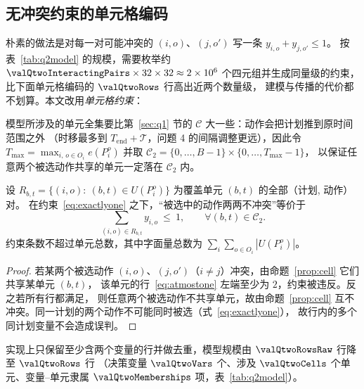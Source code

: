 \subsection{无冲突约束的单元格编码}

朴素的做法是对每一对可能冲突的 $(i,o)$、$(j,o')$ 写一条 $y_{i,o}+y_{j,o'}\le 1$。
按表~\ref{tab:q2model} 的规模，需要枚举约 $\valQtwoInteractingPairs\times 32\times 32\approx 2\times 10^{6}$
个四元组并生成同量级的约束，比下面单元格编码的 $\valQtwoRows$ 行高出近两个数量级，
建模与传播的代价都不划算。本文改用\emph{单元格约束}：

模型所涉及的单元全集要比第~\ref{sec:q1} 节的 $\mathcal{C}$ 大一些：动作会把计划推到原时间范围之外
（时移最多到 $T_{\mathrm{end}}+\mathcal{T}$，问题 4 的间隔调整更远），因此令
$T_{\max}=\max_{i,\,o\in O_i}e(P_i^{o})$ 并取 $\mathcal{C}_2=\{0,\dots,B-1\}\times\{0,\dots,T_{\max}-1\}$，
以保证任意两个被选动作共享的单元一定落在 $\mathcal{C}_2$ 内。

\begin{proposition}[单元格编码的精确性]\label{prop:exact}
设 $R_{b,t}=\{(i,o):\ (b,t)\in U(P_i^{o})\}$ 为覆盖单元 $(b,t)$ 的全部（计划, 动作）对。
在约束~\eqref{eq:exactlyone} 之下，“被选中的动作两两不冲突”等价于
\begin{equation}\label{eq:atmostone}
  \sum_{(i,o)\in R_{b,t}} y_{i,o}\ \le\ 1,\qquad \forall (b,t)\in\mathcal{C}_2.
\end{equation}
约束条数不超过单元总数，其中字面量总数为 $\sum_i\sum_{o\in O_i}|U(P_i^{o})|$。
\end{proposition}

\begin{proof}
若某两个被选动作 $(i,o)$、$(j,o')$（$i\neq j$）冲突，由命题~\ref{prop:cell} 它们共享某单元 $(b,t)$，
该单元的行~\eqref{eq:atmostone} 左端至少为 $2$，约束被违反。反之若所有行都满足，
则任意两个被选动作不共享单元，故由命题~\ref{prop:cell} 互不冲突。同一计划的两个动作不可能同时被选（式~\eqref{eq:exactlyone}），
故行内的多个同计划变量不会造成误判。
\end{proof}

实现上只保留至少含两个变量的行并做去重，模型规模由 $\valQtwoRowsRaw$ 行降至 $\valQtwoRows$ 行
（决策变量 $\valQtwoVars$ 个、涉及 $\valQtwoCells$ 个单元、变量--单元隶属 $\valQtwoMemberships$ 项，表~\ref{tab:q2model}）。

